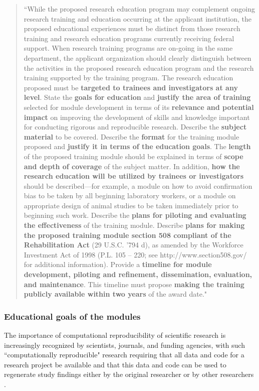 \documentclass[pdftex,english,11pt,parskip=half]{scrartcl}
\begin{document}
\begin{quotation}
``While the proposed research education program may complement ongoing research training and education occurring at the applicant institution, the proposed educational experiences must be distinct from those research training and research education programs currently receiving federal support. When research training programs are on-going in the same department, the applicant organization should clearly distinguish between the activities in the proposed research education program and the research training supported by the training program. The research education proposed must be \textbf{targeted to trainees and investigators at any level}. State the \textbf{goals for education} and \textbf{justify the area of training} selected for module development in terms of its \textbf{relevance and potential impact} on improving the development of skills and knowledge important for conducting rigorous and reproducible research. Describe the \textbf{subject material} to be covered.  Describe the \textbf{format} for the training module proposed and \textbf{justify it in terms of the education goals}.  The \textbf{length} of the proposed training module should be explained in terms of \textbf{scope and depth of coverage} of the subject matter.  In addition, \textbf{how the research education will be utilized by trainees or investigators} should be described---for example, a module on how to avoid confirmation bias to be taken by all beginning laboratory workers, or a module on appropriate design of animal studies to be taken immediately prior to beginning such work.  Describe the \textbf{plans for piloting and evaluating the effectiveness} of the training module. Describe \textbf{plans for making the proposed training module section 508 compliant of the Rehabilitation Act} (29 U.S.C. '794 d), as amended by the Workforce Investment Act of 1998 (P.L. 105 – 220; see http://www.section508.gov/ for additional information). Provide a \textbf{timeline for module development, piloting and refinement, dissemination, evaluation, and maintenance}.  This timeline must propose \textbf{making the training publicly available within two years} of the award date."
\end{quotation}

\subsubsection*{Educational goals of the modules}

The importance of computational reproducibility of scientific research is increasingly recognized by scientists, journals, and funding agencies, with such ``computationally reproducible" research requiring that all data and code for a research project be available and that this data and code can be used to regenerate study findings either by the original researcher or by other researchers \cite{ellis2017share, ram2013git}.
\end{document}
